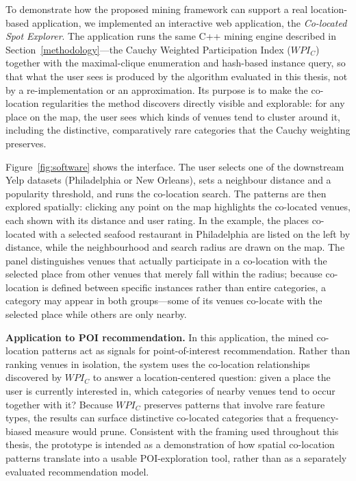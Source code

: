 \documentclass[12pt, letterpaper]{template}
\theoremstyle{definition}
\begin{document}
To demonstrate how the proposed mining framework can support a real
location-based application, we implemented an interactive web application, the
\emph{Co-located Spot Explorer}. The application runs the same C++ mining engine
described in Section~\ref{methodology}---the Cauchy Weighted Participation Index
($WPI_C$) together with the maximal-clique enumeration and hash-based instance
query, so that what the user sees is produced by the algorithm evaluated in this
thesis, not by a re-implementation or an approximation. Its purpose is to make
the co-location regularities the method discovers directly visible and
explorable: for any place on the map, the user sees which kinds of venues tend to
cluster around it, including the distinctive, comparatively rare categories that
the Cauchy weighting preserves.


Figure~\ref{fig:software} shows the interface. The user selects one of the
downstream Yelp datasets (Philadelphia or New Orleans), sets a neighbour distance
and a popularity threshold, and runs the co-location search. The patterns are then
explored spatially: clicking any point on the map highlights the co-located venues,
each shown with its distance and user rating. In the example, the places co-located
with a selected seafood restaurant in Philadelphia are listed on the left by
distance, while the neighbourhood and search radius are drawn on the map. The
panel distinguishes venues that actually participate in a co-location with the
selected place from other venues that merely fall within the radius; because
co-location is defined between specific instances rather than entire categories,
a category may appear in both groups---some of its venues co-locate with the
selected place while others are only nearby.


\noindent\textbf{Application to POI recommendation.} In this application, the
mined co-location patterns act as signals for point-of-interest
recommendation. Rather than ranking venues in isolation, the system uses the
co-location relationships discovered by $WPI_C$ to answer a location-centered
question: given a place the user is currently interested in, which categories of
nearby venues tend to occur together with it? Because $WPI_C$ preserves patterns
that involve rare feature types, the results can surface distinctive co-located
categories that a frequency-biased measure would prune. Consistent with the
framing used throughout this thesis, the prototype is intended as a demonstration
of how spatial co-location patterns translate into a usable POI-exploration tool,
rather than as a separately evaluated recommendation model.
\end{document}
